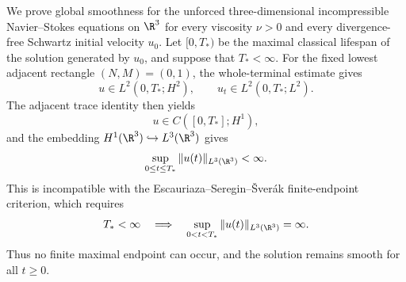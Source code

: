 
We prove global smoothness for the unforced three-dimensional incompressible Navier--Stokes equations on \(\R^3\) for every viscosity \(\nu>0\) and every divergence-free Schwartz initial velocity \(u_0\).
Let \([0,T_*)\) be the maximal classical lifespan of the solution generated by \(u_0\), and suppose that \(T_*<\infty\).
For the fixed lowest adjacent rectangle \((N,M)=(0,1)\), the whole-terminal estimate gives
\[
u\in L^2(0,T_*;H^2),
\qquad
u_t\in L^2(0,T_*;L^2).
\]
The adjacent trace identity then yields
\[
u\in C([0,T_*];H^1),
\]
and the embedding \(H^1(\R^3)\hookrightarrow L^3(\R^3)\) gives
\[
\sup_{0\leq t\leq T_*}\|u(t)\|_{L^3(\R^3)}<\infty.
\]
This is incompatible with the Escauriaza--Seregin--\v{S}ver\'ak finite-endpoint criterion, which requires
\[
T_*<\infty
\quad\Longrightarrow\quad
\sup_{0<t<T_*}\|u(t)\|_{L^3(\R^3)}=\infty.
\]
Thus no finite maximal endpoint can occur, and the solution remains smooth for all \(t\geq0\).
